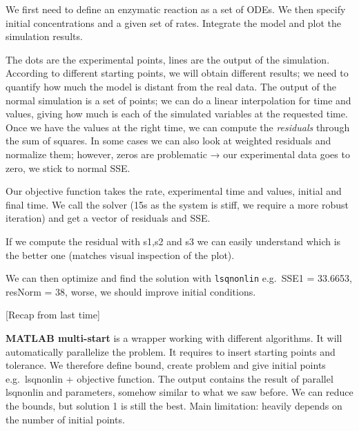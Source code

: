 We first need to define an enzymatic reaction as a set of ODEs. We then
specify initial concentrations and a given set of rates. Integrate the
model and plot the simulation results.

The dots are the experimental points, lines are the output of the
simulation. According to different starting points, we will obtain
different results; we need to quantify how much the model is distant
from the real data. The output of the normal simulation is a set of
points; we can do a linear interpolation for time and values, giving how
much is each of the simulated variables at the requested time. Once we
have the values at the right time, we can compute the \emph{residuals}
through the sum of squares. In some cases we can also look at weighted
residuals and normalize them; however, zeros are problematic → our
experimental data goes to zero, we stick to normal SSE.

Our objective function takes the rate, experimental time and values,
initial and final time. We call the solver (15s as the system is stiff,
we require a more robust iteration) and get a vector of residuals and
SSE.

If we compute the residual with s1,s2 and s3 we can easily understand
which is the better one (matches visual inspection of the plot).

We can then optimize and find the solution with \texttt{lsqnonlin}
e.g.~SSE1 = 33.6653, resNorm = 38, worse, we should improve initial
conditions.

{[}Recap from last time{]}

\textbf{MATLAB multi-start} is a wrapper working with different
algorithms. It will automatically parallelize the problem. It requires
to insert starting points and tolerance. We therefore define bound,
create problem and give initial points e.g.~lsqnonlin + objective
function. The output contains the result of parallel lsqnonlin and
parameters, somehow similar to what we saw before. We can reduce the
bounds, but solution 1 is still the best. Main limitation: heavily
depends on the number of initial points.

